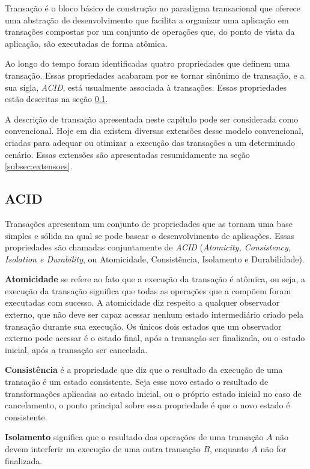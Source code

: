 \documentclass[11pt,twoside,a4paper]{book}
\begin{document}
Transação é o bloco básico de construção no paradigma transacional que oferece uma abstração de desenvolvimento que facilita a organizar uma aplicação em transações compostas por um conjunto de operações que, do ponto de vista da aplicação, são executadas de forma atômica. 

Ao longo do tempo foram identificadas quatro propriedades que definem uma transação. Essas propriedades acabaram por se tornar sinônimo de transação, e a sua sigla, \emph{ACID}, está usualmente associada à transações. Essas propriedades estão descritas na seção \ref{subsec:acid}.

A descrição de transação apresentada neste capítulo pode ser considerada como convencional. Hoje em dia existem diversas extensões desse modelo convencional, criadas para adequar ou otimizar a execução das transações a um determinado cenário. Essas extensões são apresentadas resumidamente na seção \ref{subsec:extensoes}.

\subsection{ACID}
\label{subsec:acid}
Transações apresentam um conjunto de propriedades que as tornam uma base simples e sólida na qual se pode basear o desenvolvimento de aplicações. Essas propriedades são chamadas conjuntamente de \emph{ACID} (\emph{Atomicity, Consistency, Isolation e Durability}, ou Atomicidade, Consistência, Isolamento e Durabilidade). 

\textbf{Atomicidade} se refere ao fato que a execução da transação é atômica, ou seja, a execução da transação significa que todas as operações que a compõem foram executadas com sucesso. A atomicidade diz respeito a qualquer observador externo, que não deve ser capaz acessar nenhum estado intermediário criado pela transação durante sua execução. Os únicos dois estados que um observador externo pode acessar é o estado final, após a transação ser finalizada, ou o estado inicial, após a transação ser cancelada.

\textbf{Consistência} é a propriedade que diz que o resultado da execução de uma transação é um estado consistente. Seja esse novo estado o resultado de transformações aplicadas ao estado inicial, ou o próprio estado inicial no caso de cancelamento, o ponto principal sobre essa propriedade é que o novo estado é consistente.

\textbf{Isolamento} significa que o resultado das operações de uma transação $A$ não devem interferir na execução de uma outra transação $B$, enquanto $A$ não for finalizada.
\end{document}
